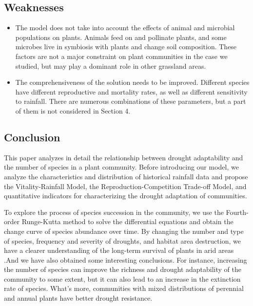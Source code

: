 \documentclass{mcmthesis}
\begin{document}
\subsection{Weaknesses}

\begin{itemize}
	\item The model does not take into account the effects of animal and microbial populations on plants. Animals feed on and pollinate plants, and some microbes live in symbiosis with plants and change soil composition. These factors are not a major constraint on plant communities in the case we studied, but may play a dominant role in other grassland areas.
	
	\item The comprehensiveness of the solution needs to be improved. Different species have different reproductive and mortality rates, as well as different sensitivity to rainfall. There are numerous combinations of these parameters, but a part of them is not considered in Section 4.
	
\end{itemize}

\subsection{Conclusion}

This paper analyzes in detail the relationship between drought adaptability and the number of species in a plant community. Before introducing our model, we analyze the characteristics and distribution of historical rainfall data and propose the Vitality-Rainfall Model, the Reproduction-Competition Trade-off Model, and quantitative indicators for characterizing the drought adaptation of communities.

To explore the process of species succession in the community, we use the Fourth-order Runge-Kutta method to solve the differential equations and obtain the change curve of species abundance over time. By changing the number and type of species, frequency and severity of droughts, and habitat area destruction, we have a clearer understanding of the long-term survival of plants in arid areas .And we have also obtained some interesting conclusions. For instance, increasing the number of species can improve the richness and drought adaptability of the community to some extent, but it can also lead to an increase in the extinction rate of species. What's more, communities with mixed distributions of perennial and annual plants have better drought resistance.
\end{document}
